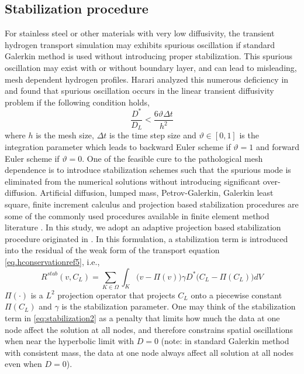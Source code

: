 \documentclass[10pt]{elsarticle}
\begin{document}
\subsection{Stabilization procedure}
For stainless steel or other materials with very low diffusivity, the transient hydrogen
transport simulation may exhibits spurious oscillation if standard Galerkin method is
used without introducing proper stabilization. This spurious oscillation may exist
with or without boundary layer, and can lead to misleading, mesh dependent hydrogen profiles. Harari analyzed this numerous deficiency in \citep{Harari:2004} and found that spurious oscillation occurs in the linear transient diffusivity problem if the following condition holds, 
\begin{equation}
\label{eq:StabilityLimit} \frac{D^{*}}{D_{L}} < \frac{6 \vartheta \Delta t}{h^{2}}
\end{equation}
where $h$ is the mesh size, $\Delta t$ is the time step size and $\vartheta \in [0,1]$
is the integration parameter which leads to backward Euler scheme if $\vartheta = 1$
and forward Euler scheme if $\vartheta = 0$. One of the feasible cure to the
pathological mesh dependence is to introduce stabilization schemes such that
the spurious mode is eliminated from the numerical solutions without introducing
significant over-diffusion. Artificial diffusion,
lumped mass, Petrov-Galerkin, Galerkin least square, finite increment calculus and
projection based stabilization procedures are some of the commonly used
procedures available in finite element method literature \citep{Onate:2000,
Dohrmann:2004, Johnson:2009, Sun:2013}. 
In this study, we adopt an adaptive projection based stabilization procedure
originated in \citep{Sun:2013}. In this formulation,  a stabilization term is introduced into the residual of the weak
form of the transport equation \eqref{eq.hconservationref5}, i.e.,
\begin{equation}
\label{eq:stabilization2} R^{stab}(v, C_{L}) = \sum_{K \in \Omega}  \int_{K}  \Big( v  - \Pi (v)  \Big)  \gamma D^{*} \Big( C_{L} - \Pi (C_{L}) \Big)  dV
\end{equation}
$\Pi(\cdot)$ is a $L^{2}$ projection operator that projects $C_{L}$ onto a piecewise constant $\Pi (C_{L})$ and $\gamma$ is the stabilization parameter. One may think of the stabilization term in \eqref{eq:stabilization2} as a penalty that limits how much the data at one node affect the solution at all nodes, and therefore constrains spatial oscillations when near the hyperbolic limit with $D=0$ (note: in standard Galerkin method with consistent mass, the data at one node always affect all solution at all nodes even when $D=0$).
\end{document}
